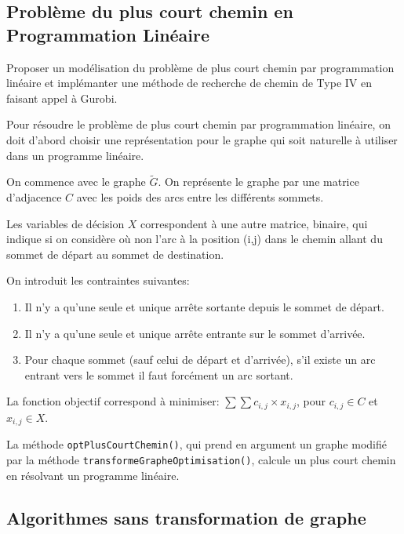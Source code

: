 \subsection{Problème du plus court chemin en Programmation Linéaire}
\label{sec:plus-court-pl}

\begin{question}
  Proposer un modélisation du problème de plus court chemin par programmation
  linéaire et implémanter une méthode de recherche de chemin de Type IV en
  faisant appel à Gurobi.
\end{question}

Pour résoudre le problème de plus court chemin par programmation linéaire, on
doit d'abord choisir une représentation pour le graphe qui soit naturelle à
utiliser dans un programme linéaire.

On commence avec le graphe $\tilde{G}$. On représente le graphe par une matrice
d'adjacence $C$ avec les poids des arcs entre les différents sommets.

Les variables de décision $X$ correspondent à une autre matrice, binaire, qui
indique si on considère où non l'arc à la position (i,j) dans le chemin allant
du sommet de départ au sommet de destination.

On introduit les contraintes suivantes:
\begin{enumerate}
\item Il n'y a qu'une seule et unique arrête sortante depuis le sommet de
  départ.
\item Il n'y a qu'une seule et unique arrête entrante sur le sommet d'arrivée.
\item Pour chaque sommet (sauf celui de départ et d'arrivée), s'il existe un arc
  entrant vers le sommet il faut forcément un arc sortant.
\end{enumerate}

La fonction objectif correspond à minimiser: $\sum \sum c_{i,j} \times x_{i,j}$,
pour $c_{i,j} \in C$ et $x_{i,j} \in X$.

La méthode \verb|optPlusCourtChemin()|, qui prend en argument un graphe modifié
par la méthode \verb|transformeGrapheOptimisation()|, calcule un plus court
chemin en résolvant un programme linéaire.

\subsection{Algorithmes sans transformation de graphe}
\label{sec:algos-sans-transfo}


